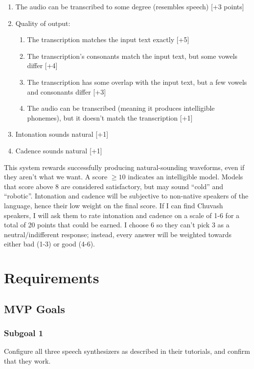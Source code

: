 \documentclass[fleqn,10pt]{SelfArx} %
\begin{document}
	\begin{enumerate}
		\item The audio can be transcribed to some degree (resembles speech) [+3 points]
		\item Quality of output:
		\begin{enumerate}
			\item The transcription matches the input text exactly [+5]
			\item The transcription's consonants match the input text, but some vowels differ [+4]
			\item The transcription has some overlap with the input text, but a few vowels and consonants differ [+3]
			\item The audio can be transcribed (meaning it produces intelligible phonemes), but it doesn't match the transcription [+1]
		\end{enumerate}
		\item Intonation sounds natural [+1]
		\item Cadence sounds natural [+1]
	\end{enumerate}
	
	This system rewards successfully producing natural-sounding waveforms, even if they aren't what we want. A score $\geq10$ indicates an intelligible model. Models that score above 8 are considered satisfactory, but may sound ``cold'' and ``robotic''. Intonation and cadence will be subjective to non-native speakers of the language, hence their low weight on the final score. If I can find Chuvash speakers, I will ask them to rate intonation and cadence on a scale of 1-6 for a total of 20 points that could be earned. I choose 6 so they can't pick 3 as a neutral/indifferent response; instead, every answer will be weighted towards either bad (1-3) or good (4-6).
	
	\section{Requirements}
	\subsection{MVP Goals}
	\subsubsection{Subgoal 1}
	Configure all three speech synthesizers as described in their tutorials, and confirm that they work.
\end{document}
